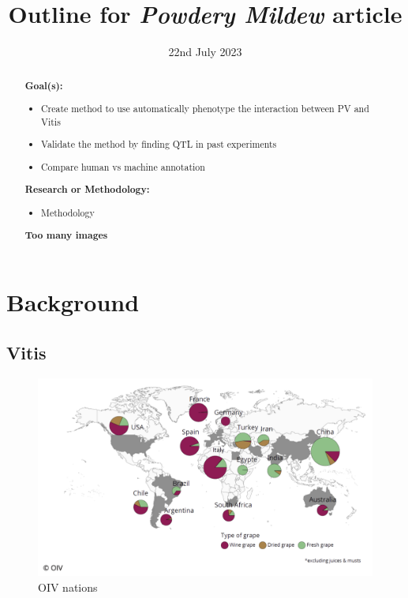 \documentclass[english]{article}
\title{ Outline for \textit{Powdery Mildew} article}
\date{22nd July 2023}
\author{}
\begin{document}
\maketitle

\begin{changemargin}{60pt}{60pt}
	\begin{abstract}
		\textbf{Goal(s):}
		\begin{itemize}
			\item Create method to use automatically phenotype the interaction between PV and Vitis
			\item Validate the method by finding QTL in past experiments
			\item Compare human vs machine annotation
		\end{itemize}

		\textbf{Research or Methodology:}
		\begin{itemize}
			\item Methodology
		\end{itemize}

		\textbf{Too many images}
	\end{abstract}
\end{changemargin}

\tableofcontents

\section{Background}

\subsection{Vitis}

\begin{figure}[H]
	\begin{center}
		\includegraphics[width=0.7\linewidth]{2023_cdt_oiv_world.png}
		\caption{OIV nations}\label{fig:oivworld}
	\end{center}
\end{figure}
\end{document}
